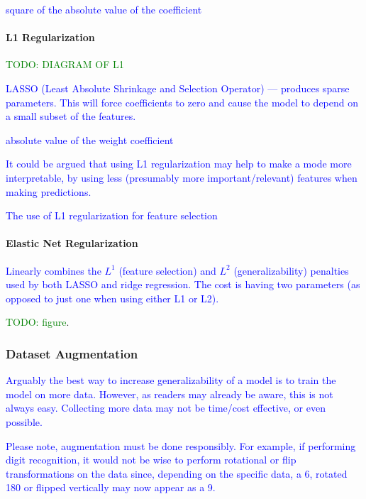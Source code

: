 \textcolor{blue}{square of the absolute value of the coefficient}


\paragraph{L1 Regularization}

\textcolor{green}{TODO: DIAGRAM OF L1}

\textcolor{blue}{LASSO (Least Absolute Shrinkage and Selection Operator) --- produces sparse parameters. This will force coefficients to zero and cause the model to depend on a small subset of the features.}

\textcolor{blue}{absolute value of the weight coefficient}

\textcolor{blue}{It could be argued that using L1 regularization may help to make a mode more interpretable, by using less (presumably more important/relevant) features when making predictions.}

\textcolor{blue}{The use of L1 regularization for feature selection}


\paragraph{Elastic Net Regularization}

\textcolor{blue}{Linearly combines the $L^1$ (feature selection) and $L^2$ (generalizability) penalties used by both LASSO and ridge regression. The cost is having two parameters (as opposed to just one when using either L1 or L2).}

\textcolor{green}{TODO: figure}.

\subsubsection{Dataset Augmentation}

\textcolor{blue}{Arguably the best way to increase generalizability of a model is to train the model on more data. However, as readers may already be aware, this is not always easy. Collecting more data may not be time/cost effective, or even possible.}

\textcolor{blue}{Please note, augmentation must be done responsibly. For example, if performing digit recognition, it would not be wise to perform rotational or flip transformations on the data since, depending on the specific data, a 6, rotated 180 or flipped vertically may now appear as a 9.}

